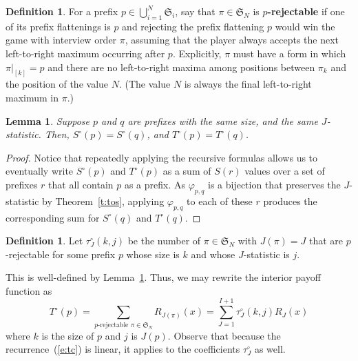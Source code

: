 \documentclass[11pt]{amsart}   %
\newtheorem{lemma}[theorem]{Lemma}
\theoremstyle{definition}
\newtheorem{definition}[theorem]{Definition}
\theoremstyle{remark}
\numberwithin{equation}{section}
\theoremstyle{theorem}
\newcommand{\SN}{\mathfrak{S}}
\newcommand{\pf}[1]{\pi|_{[#1]}}
\begin{document}
\begin{definition}\label{d:reject}
For a prefix $p \in \bigcup_{i=1}^N \SN_i$, say that $\pi \in \SN_N$ is {\bf
$p$-rejectable} if one of its prefix flattenings is $p$ and rejecting the
prefix flattening $p$ would win the game with interview order $\pi$, assuming
that the player always accepts the next left-to-right maximum occurring after
$p$.  Explicitly, $\pi$ must have a form in which $\pf{k} = p$ and there are no
left-to-right maxima among positions between $\pi_k$ and the position of the
value $N$.  (The value $N$ is always the final left-to-right maximum in $\pi$.)
\end{definition}

\begin{lemma}\label{l:nop2}
Suppose $p$ and $q$ are prefixes with the same size, and the same
$J$-statistic.  Then, $S^\circ(p) = S^\circ(q)$, and $T^\circ(p) = T^\circ(q)$.
\end{lemma}
\begin{proof}
Notice that repeatedly applying the recursive formulas allows us to eventually
write $S^\circ(p)$ and $T^\circ(p)$ as a sum of $S(r)$ values over a set of
prefixes $r$ that all contain $p$ as a prefix.  As $\varphi_{p,q}$ is a
bijection that preserves the $J$-statistic by Theorem~\ref{t:tos}, applying
$\varphi_{p,q}$ to each of these $r$ produces the corresponding sum for
$S^\circ(q)$ and $T^\circ(q)$.  
\end{proof}

\begin{definition}
Let $\tau^\circ_J(k, j)$ be the number of $\pi \in \SN_N$ with $J(\pi) = J$ that are $p$-rejectable for some prefix $p$ whose size is $k$ and whose $J$-statistic is $j$.
\end{definition}

This is well-defined by Lemma~\ref{l:nop2}.  Thus, we may rewrite the interior payoff function as
\[ T^\circ(p) = \sum\limits_{p\text{-rejectable } \pi \in \SN_N}  R_{J(\pi)}(x) = \sum_{J=1}^{I+1} \tau^\circ_J(k, j) R_J(x) \]
where $k$ is the size of $p$ and $j$ is $J(p)$.  Observe that because the
recurrence~(\ref{e:tc}) is linear, it applies to the coefficients
$\tau^\circ_J$ as well.  
\end{document}
